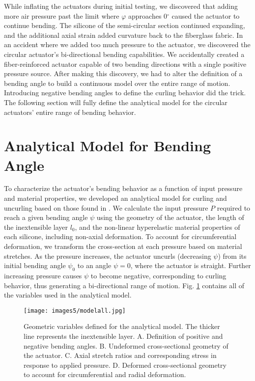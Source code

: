While inflating the actuators during initial testing, we discovered that adding more air pressure past the limit where $\varphi$ approaches 0$^\circ$ caused the actuator to continue bending. The silicone of the semi-circular section continued expanding, and the additional axial strain added curvature back to the fiberglass fabric. In an accident where we added too much pressure to the actuator, we discovered the circular actuator's bi-directional bending capabilities. We accidentally created a fiber-reinforced actuator capable of two bending directions with a single positive pressure source. After making this discovery, we had to alter the definition of a bending angle to build a continuous model over the entire range of motion. Introducing negative bending angles to define the curling behavior did the trick. The following section will fully define the analytical model for the circular actuators' entire range of bending behavior. 

\section{Analytical Model for Bending Angle}

To characterize the actuator's bending behavior as a function of input pressure and material properties, we developed an analytical model for curling and uncurling based on those found in \cite{polygerinos_modeling_2015, connolly_automatic_2017, hu_precurved_2022}. We calculate the input pressure $P$ required to reach a given bending angle $\psi$ using the geometry of the actuator, the length of the inextensible layer $l_0$, and the non-linear hyperelastic material properties of each silicone, including non-axial deformation. To account for circumferential deformation, we transform the cross-section at each pressure based on material stretches. As the pressure increases, the actuator uncurls (decreasing $\psi$) from its initial bending angle $\psi_0$ to an angle $\psi=0$, where the actuator is straight. Further increasing pressure causes $\psi$ to become negative, corresponding to curling behavior, thus generating a bi-directional range of motion. Fig. \ref{fig:modelall} contains all of the variables used in the analytical model. 

\begin{figure}[h]
    \centering
     \texttt{[image: images5/modelall.jpg]}
    \caption{Geometric variables defined for the analytical model. The thicker line represents the inextensible layer. A. Definition of positive and negative bending angles. B. Undeformed cross-sectional geometry of the actuator. C. Axial stretch ratios and corresponding stress in response to applied pressure. D. Deformed cross-sectional geometry to account for circumferential and radial deformation.}
    \label{fig:modelall}
\end{figure}

